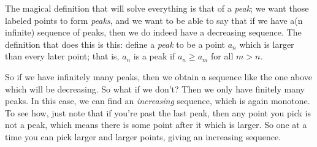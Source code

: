 \begin{proofidea}
\begin{tightfigure}
  \end{tightfigure}

  The magical definition that will solve everything is that of a
  \textit{peak}; we want those labeled points to form \textit{peaks},
  and we want to be able to say that if we have a(n infinite)
  sequence of peaks, then we do indeed have a decreasing sequence.
  The definition that does this is this: define a \textit{peak} to be
  a point $a_n$ which is larger than every later point; that is,
  $a_n$ is a peak if $a_n \geq a_m$ for all $m > n$.

  So if we have infinitely many peaks, then we obtain a sequence like
  the one above which will be decreasing. So what if we don't? Then
  we only have finitely many peaks. In this case, we can find an
  \textit{increasing} sequence, which is again monotone. To see how,
  just note that if you're past the last peak, then any point you
  pick is not a peak, which means there is some point after it which
  is larger. So one at a time you can pick larger and larger points,
  giving an increasing sequence.

  \begin{tightfigure}
    \centering
\end{tightfigure}
\end{proofidea}
